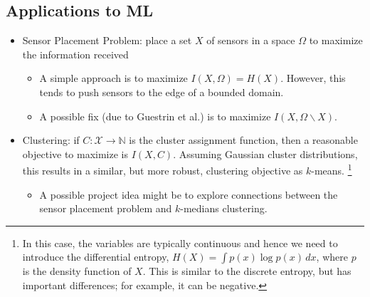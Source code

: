 \documentclass{article}
\newcommand{\sminus}{\backslash}                    %
\newcommand{\N}{\mathbb{N}}                         %
\newcommand{\X}{\mathcal{X}}                        %
\begin{document}
\subsection{Applications to ML}
\begin{itemize}
\item Sensor Placement Problem: place a set $X$ of sensors in a space $\Omega$
to maximize the information received
\begin{itemize}
\item A simple approach is to maximize $I(X, \Omega) = H(X)$. However, this
tends to push sensors to the edge of a bounded domain.
\item A possible fix (due to Guestrin et al.) is to maximize
$I(X, \Omega \sminus X)$.
\end{itemize}
\item Clustering: if $C : \X \to \N$ is the cluster assignment function, then a
reasonable objective to maximize is $I(X, C)$. Assuming Gaussian cluster
distributions, this results in a similar, but more robust, clustering objective
as $k$-means.
\footnote{In this case, the variables are typically continuous and hence we
need to introduce the differential entropy, $H(X) = \int p(x) \log p(x) \, dx$,
where $p$ is the density function of $X$. This is similar to the discrete
entropy, but has important differences; for example, it can be negative.}
\begin{itemize}
\item A possible project idea might be to explore connections between the
sensor placement problem and $k$-medians clustering.
\end{itemize}
\end{itemize}
\end{document}
